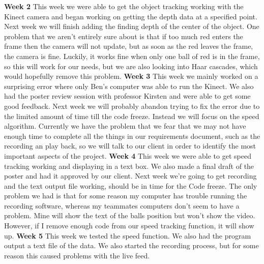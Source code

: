 \documentclass[onecolumn, draftclsnofoot,10pt, compsoc]{IEEEtran}
\begin{document}
\textbf{Week 2}
\newline
This week we were able to get the object tracking working with the Kinect camera and began working on getting the depth data at a specified point.
\newline
Next week we will finish adding the finding depth of the center of the object.
\newline
One problem that we aren't entirely sure about is that if too much red enters the frame then the camera will not update, but as soon as the red leaves the frame, the camera is fine. Luckily, it works fine when only one ball of red is in the frame, so this will work for our needs, but we are also looking into Haar cascades, which would hopefully remove this problem.
\newline
\textbf{Week 3}
\newline
This week we mainly worked on a surprising error where only Ben's computer was able to run the Kinect. We also had the poster review session with professor Kirsten and were able to get some good feedback.
\newline
Next week we will probably abandon trying to fix the error due to the limited amount of time till the code freeze. Instead we will focus on the speed algorithm.
\newline
Currently we have the problem that we fear that we may not have enough time to complete all the things in our requirements document, such as the recording an play back, so we will talk to our client in order to identify the most important aspects of the project.
\newline
\textbf{Week 4}
\newline
This week we were able to get speed tracking working and displaying in a text box. We also made a final draft of the poster and had it approved by our client.
\newline
Next week we're going to get recording and the text output file working, should be in time for the Code freeze.
\newline
The only problem we had is that for some reason my computer has trouble running the recording software, whereas my teammates computers don't seem to have a problem. Mine will show the text of the balls position but won't show the video. However, if I remove enough code from our speed tracking function, it will show up.
\newline
\textbf{Week 5}
\newline
This week we tested the speed function. We also had the program output a text file of the data. We also started the recording process, but for some reason this caused problems with the live feed.
\end{document}
